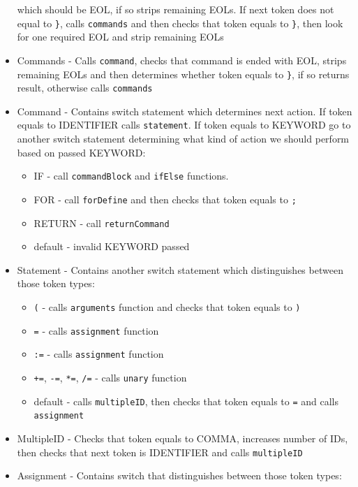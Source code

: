 \documentclass[11pt, titlepage]{article}
\begin{document}
\begin{itemize}[itemsep=-5pt]
  which should be EOL, if so strips remaining EOLs. If next token does
  not equal to \texttt{\}}, calls \texttt{commands} and then checks that
  token equals to \texttt{\}}, then look for one required EOL and strip
  remaining EOLs
\item
  Commands - Calls \texttt{command}, checks that command is ended with
  EOL, strips remaining EOLs and then determines whether token equals to
  \texttt{\}}, if so returns result, otherwise calls \texttt{commands}
\item
  Command - Contains switch statement which determines next action. If
  token equals to IDENTIFIER calls \texttt{statement}. If token equals
  to KEYWORD go to another switch statement determining what kind of
  action we should perform based on passed KEYWORD:

  \begin{itemize}[itemsep=-5pt]
  \item
    IF - call \texttt{commandBlock} and \texttt{ifElse} functions.
  \item
    FOR - call \texttt{forDefine} and then checks that token equals to
    \texttt{;}
  \item
    RETURN - call \texttt{returnCommand}
  \item
    default - invalid KEYWORD passed
  \end{itemize}
\item
  Statement - Contains another switch statement which distinguishes
  between those token types:

  \begin{itemize}[itemsep=-5pt]
  \item
    \texttt{(} - calls \texttt{arguments} function and checks that token
    equals to \texttt{)}
  \item
    \texttt{=} - calls \texttt{assignment} function
  \item
    \texttt{:=} - calls \texttt{assignment} function
  \item
    \texttt{+=}, \texttt{-=}, \texttt{*=}, \texttt{/=} - calls
    \texttt{unary} function
  \item
    default - calls \texttt{multipleID}, then checks that token equals
    to \texttt{=} and calls \texttt{assignment}
  \end{itemize}
\item
  MultipleID - Checks that token equals to COMMA, increases number of
  IDs, then checks that next token is IDENTIFIER and calls
  \texttt{multipleID}
\item
  Assignment - Contains switch that distinguishes between those token
  types:


\end{itemize}
\end{document}
